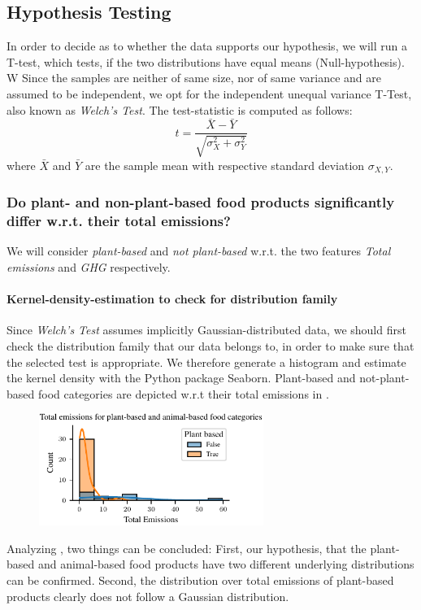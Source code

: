 \documentclass{article}
\begin{document}
\subsection*{Hypothesis Testing}
In order  to decide as to whether the data supports our hypothesis, we will run a T-test, which tests, if the two distributions have equal means (Null-hypothesis). W Since the samples are neither of same size, nor of same variance and are assumed to be independent, we opt for the independent unequal variance T-Test, also known as \textit{Welch's Test}. %
The test-statistic is computed as follows:
\begin{equation}\label{eq:t-test}
  t = \frac{\bar{X}-\bar{Y}}{\sqrt{\sigma^2_{X}+\sigma^2_{Y}}}
\end{equation}
where $\bar{X}$ and  $\bar{Y}$ are the sample mean with respective standard deviation $\sigma_{X,Y}$.

\subsubsection*{Do plant- and non-plant-based food products significantly differ w.r.t. their total emissions?}


 We will consider \textit{plant-based} and \textit{not plant-based} w.r.t.  the two features \textit{Total emissions} and \textit{GHG} respectively.
\paragraph*{Kernel-density-estimation to check for distribution family} Since \textit{Welch's Test} assumes implicitly Gaussian-distributed data, we should first check the distribution family that  our data belongs to, in order to make sure that the selected test is appropriate. We therefore generate a histogram and estimate the kernel density with the Python package Seaborn. Plant-based and not-plant-based food categories are depicted w.r.t their total emissions in .
\begin{figure}[h]\label{fig:emissions}
  \centering
  \includegraphics[width=0.65\textwidth]{figures/emissions.pdf}
  \label{fig:emissions}
\end{figure}
Analyzing , two things can be concluded: First, our hypothesis, that the plant-based and animal-based food products have two different underlying distributions can be confirmed. Second, the distribution over total emissions of plant-based products clearly does not follow a Gaussian distribution. 
\end{document}
